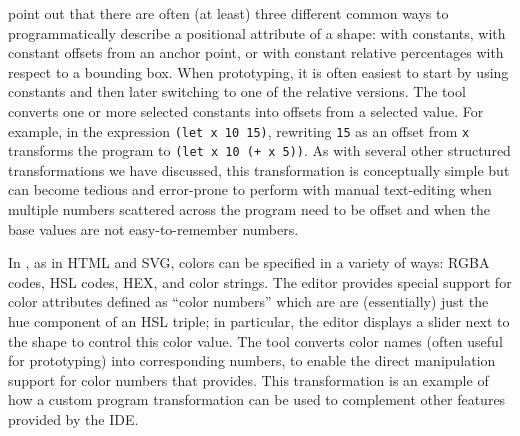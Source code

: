 



\citet{sns-uist} point out that there are often (at least) three
different common ways to programmatically describe a positional
attribute of a shape: with constants, with constant offsets from an
anchor point, or with constant relative percentages with respect to a
bounding box. When prototyping, it is often easiest to start by
using constants and then later switching to one of the relative versions.
The  tool converts one or more selected constants
into offsets from a selected value. For example, in the expression
\verb+(let x 10 15)+, rewriting \verb+15+ as an offset from \verb+x+
transforms the program to \verb&(let x 10 (+ x 5))&. As with several
other structured transformations we have discussed, this transformation is
conceptually simple but can become tedious and error-prone to perform
with manual text-editing when
multiple numbers scattered across the program need to be offset and when
the base values are not easy-to-remember numbers.



In \sns{}, as in HTML and SVG, colors can be specified in a variety of ways: RGBA
codes, HSL codes, HEX, and color strings. The \sns{} editor provides
special support for color attributes defined as ``color numbers''
which are are (essentially) just the hue component of an HSL
triple; in particular, the editor displays a slider next to the shape to
control this color value. The  tool converts
color names (often useful for prototyping) into corresponding numbers, to enable the direct
manipulation support for color numbers that \sns{} provides. This
transformation is an example of how a custom program transformation can
be used to complement other features provided by the IDE.
